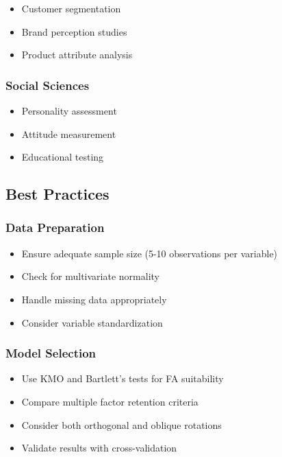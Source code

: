 \documentclass[
]{article}
\begin{document}
\begin{itemize}
\item
  Customer segmentation
\item
  Brand perception studies
\item
  Product attribute analysis
\end{itemize}

\subsubsection{Social Sciences}

\begin{itemize}
\item
  Personality assessment
\item
  Attitude measurement
\item
  Educational testing
\end{itemize}

\subsection{Best Practices}

\subsubsection{Data Preparation}

\begin{itemize}
\item
  Ensure adequate sample size (5-10 observations per variable)
\item
  Check for multivariate normality
\item
  Handle missing data appropriately
\item
  Consider variable standardization
\end{itemize}

\subsubsection{Model Selection}

\begin{itemize}
\item
  Use KMO and Bartlett's tests for FA suitability
\item
  Compare multiple factor retention criteria
\item
  Consider both orthogonal and oblique rotations
\item
  Validate results with cross-validation
\end{itemize}
\end{document}
